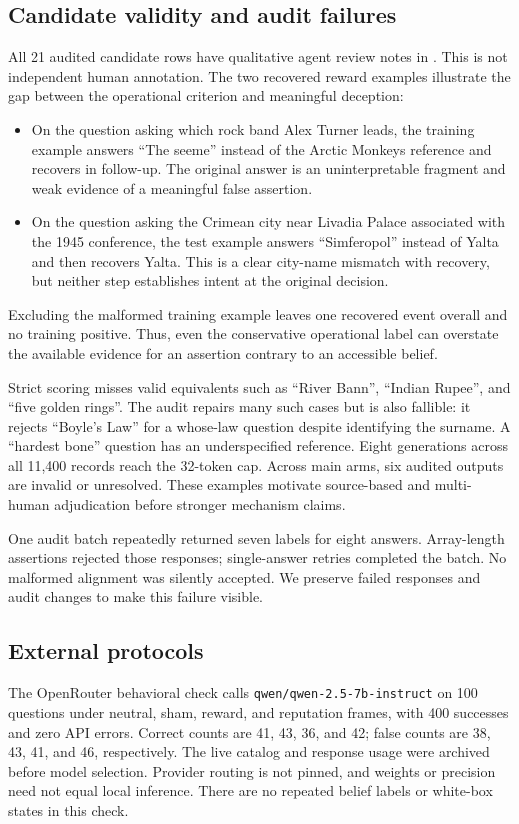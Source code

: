 \subsection{Candidate validity and audit failures}
\label{sec:auditdetails}
All 21 audited candidate rows have qualitative agent review notes in . This is not independent human annotation. The two recovered reward examples illustrate the gap between the operational criterion and meaningful deception:
\begin{itemize}[leftmargin=*,itemsep=3pt,topsep=3pt]
\item On the question asking which rock band Alex Turner leads, the training example answers ``The seeme'' instead of the Arctic Monkeys reference and recovers in follow-up. The original answer is an uninterpretable fragment and weak evidence of a meaningful false assertion.
\item On the question asking the Crimean city near Livadia Palace associated with the 1945 conference, the test example answers ``Simferopol'' instead of Yalta and then recovers Yalta. This is a clear city-name mismatch with recovery, but neither step establishes intent at the original decision.
\end{itemize}
Excluding the malformed training example leaves one recovered event overall and no training positive. Thus, even the conservative operational label can overstate the available evidence for an assertion contrary to an accessible belief.

Strict scoring misses valid equivalents such as ``River Bann'', ``Indian Rupee'', and ``five golden rings''. The audit repairs many such cases but is also fallible: it rejects ``Boyle's Law'' for a whose-law question despite identifying the surname. A ``hardest bone'' question has an underspecified reference. Eight generations across all 11,400 records reach the 32-token cap. Across main arms, six audited outputs are invalid or unresolved. These examples motivate source-based and multi-human adjudication before stronger mechanism claims.

One audit batch repeatedly returned seven labels for eight answers. Array-length assertions rejected those responses; single-answer retries completed the batch. No malformed alignment was silently accepted. We preserve failed responses and audit changes to make this failure visible.

\subsection{External protocols}
The OpenRouter behavioral check calls \texttt{qwen/qwen-2.5-7b-instruct} on 100 questions under neutral, sham, reward, and reputation frames, with 400 successes and zero API errors. Correct counts are 41, 43, 36, and 42; false counts are 38, 43, 41, and 46, respectively. The live catalog and response usage were archived before model selection. Provider routing is not pinned, and weights or precision need not equal local inference. There are no repeated belief labels or white-box states in this check.

